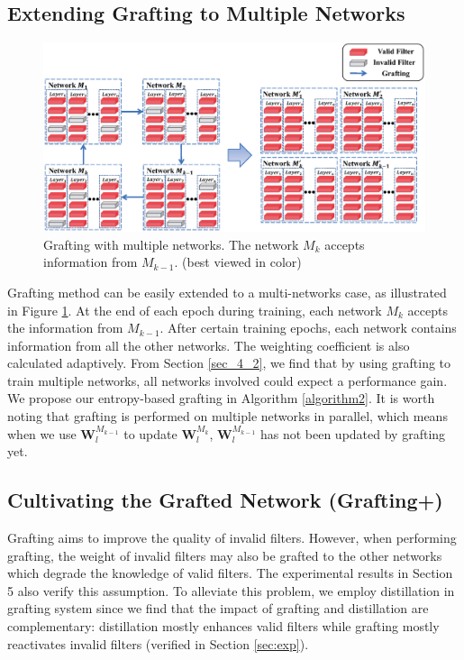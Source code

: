 \documentclass{article}
\begin{document}
\subsection{Extending Grafting to Multiple Networks}\label{sec_3_4}



\begin{figure}[!h]
	\centering
	\includegraphics[width=15cm,]{fig/multiple_grafting.eps}
	\caption{Grafting with multiple networks. The network $M_{k}$ accepts information from $M_{k-1}$. (best viewed in color)}
	\label{figure: multiple_grafting}
\end{figure}

Grafting method can be easily extended to a multi-networks case, as illustrated in Figure \ref{figure: multiple_grafting}. At the end of each epoch during training, each network $M_{k}$ accepts the information from $M_{k-1}$. After certain training epochs, each network contains information from all the other networks. The weighting coefficient is also calculated adaptively. From Section \ref{sec_4_2}, we find that by using grafting to train multiple networks, all networks involved could expect a performance gain. 
We propose our entropy-based grafting in Algorithm \ref{algorithm2}. It is worth noting that grafting is performed on multiple networks in parallel, which means when we use $\mathbf{W}^{M_{k-1}}_{l}$ to update $\mathbf{W}^{M_{k}}_{l}$, $\mathbf{W}^{M_{k-1}}_{l}$ has not been updated by grafting yet.


\subsection{Cultivating the Grafted Network (Grafting+)}\label{sec_3_5}
Grafting aims to improve the quality of invalid filters. However, when performing grafting, the weight of invalid filters may also be grafted to the other networks which degrade the knowledge of valid filters.
The experimental results in Section 5 also verify this assumption. To alleviate this problem, we employ distillation in grafting system since we find that the impact of grafting and distillation are complementary: distillation mostly enhances valid filters while grafting mostly reactivates invalid filters (verified in Section \ref{sec:exp}). 
\end{document}
